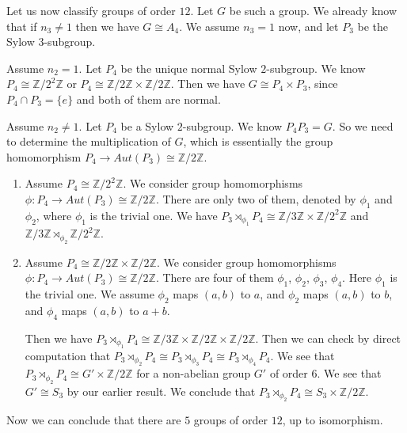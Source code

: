 \begin{example}
    Let us now classify groups of order $12$. Let $G$ be such a group. We already know that if $n_3 \neq 1$ then we have $G \cong A_4$. We assume $n_3 = 1$ now, and let $P_3$ be the Sylow $3$-subgroup.

    Assume $n_2 =1$. Let $P_4$ be the unique normal Sylow $2$-subgroup. We know $P_4 \cong \mathbb{Z}/2^2 \mathbb{Z}$ or $P_4 \cong \mathbb{Z}/2\mathbb{Z} \times \mathbb{Z}/2\mathbb{Z}$.  Then we have $G \cong P_4 \times P_3$, since $P_4 \cap P_3 = \{e\}$ and both of them are normal.



    Assume $n_2 \neq 1$. Let $P_4$ be a Sylow $2$-subgroup. We know $P_4P_3 = G$. So we need to determine the multiplication of $G$, which is essentially the group homomorphism $P_4 \rightarrow Aut(P_3) \cong \mathbb{Z}/2\mathbb{Z}$.
    \begin{enumerate}
        \item Assume $P_4 \cong \mathbb{Z}/2^2 \mathbb{Z}$. We consider group homomorphisms $\phi: P_4 \rightarrow Aut(P_3) \cong \mathbb{Z}/2\mathbb{Z}$. There are only two of them, denoted by $\phi_1$ and $\phi_2$, where $\phi_1$ is the trivial one. We have $P_3 \rtimes_{\phi_1} P_4 \cong \mathbb{Z}/3 \mathbb{Z} \times \mathbb{Z}/2^2 \mathbb{Z}$ and $\mathbb{Z}/3 \mathbb{Z} \rtimes_{\phi_2}\mathbb{Z}/2^2 \mathbb{Z}$.
        \item Assume $P_4 \cong \mathbb{Z}/2 \mathbb{Z} \times   \mathbb{Z}/2  \mathbb{Z}$. We consider group homomorphisms $\phi: P_4 \rightarrow Aut(P_3) \cong \mathbb{Z}/2\mathbb{Z}$. There are four of them $\phi_1$, $\phi_2$, $\phi_3$, $\phi_4$. Here $\phi_1$ is the trivial one. We assume $\phi_2$ maps $(a,b)$ to $a$, and $\phi_2$ maps $(a,b)$ to $b$, and $\phi_4$ maps $(a,b)$ to $a +b$.

              Then we have $P_3 \rtimes_{\phi_1} P_4 \cong \mathbb{Z}/3 \mathbb{Z} \times \mathbb{Z}/2  \mathbb{Z} \times \mathbb{Z}/2  \mathbb{Z}$. Then we can check by direct computation that   $P_3 \rtimes_{\phi_2} P_4 \cong  P_3 \rtimes_{\phi_3} P_4 \cong  P_3 \rtimes_{\phi_4} P_4$. We see that $P_3 \rtimes_{\phi_2} P_4 \cong G' \times \mathbb{Z}/2\mathbb{Z}$ for a non-abelian group $G'$ of order $6$. We see that $G' \cong S_3$ by our earlier result. We conclude that $P_3 \rtimes_{\phi_2} P_4 \cong S_3 \times \mathbb{Z}/2\mathbb{Z}$.
    \end{enumerate}

    Now we can conclude that there are $5$ groups of order $12$, up to isomorphism.
\end{example}



